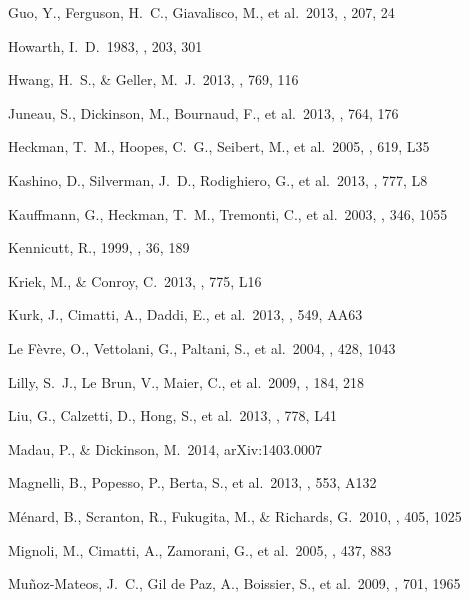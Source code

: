 \documentclass[preprint]{aastex}
\begin{document}
\begin{thebibliography}
 Guo, Y., Ferguson, H.~C., 
Giavalisco, M., et al.\ 2013, \apjs, 207, 24

 Howarth, I.~D.\ 1983, \mnras, 203, 301

 Hwang, H.~S., \& Geller, M.~J.\ 2013,
\apj, 769, 116

 Juneau, S., Dickinson, 
M., Bournaud, F., et al.\ 2013, \apj, 764, 176

 Heckman, T.~M., Hoopes, 
C.~G., Seibert, M., et al.\ 2005, \apjl, 619, L35

 Kashino, D., Silverman, 
J.~D., Rodighiero, G., et al.\ 2013, \apjl, 777, L8

 Kauffmann, G., 
Heckman, T.~M., Tremonti, C., et al.\ 2003, \mnras, 346, 1055

 Kennicutt, R., 1999, \araa, 36, 189

 Kriek, M., \& Conroy, C.\ 2013,
\apjl, 775, L16 

 Kurk, J., Cimatti, A., Daddi, E., et al.\
2013, \aap, 549, AA63

 Le F{\`e}vre, O., Vettolani, G.,
Paltani, S., et al.\ 2004, \aap, 428, 1043

 Lilly, S.~J., Le Brun, V.,
Maier, C., et al.\ 2009, \apjs, 184, 218

 Liu, G., Calzetti, D., 
Hong, S., et al.\ 2013, \apjl, 778, L41

 Madau, P., \& Dickinson, M.\ 2014,
arXiv:1403.0007

 Magnelli, B., Popesso, P.,
Berta, S., et al.\ 2013, \aap, 553, A132

 M{\'e}nard, B., Scranton, R.,
Fukugita, M., \& Richards, G.\ 2010, \mnras, 405, 1025

 Mignoli, M., Cimatti, A., Zamorani,
G., et al.\ 2005, \aap, 437, 883

Mu{\~n}oz-Mateos, J.~C., Gil de Paz, A., Boissier, S., et al.\ 2009, \apj, 
701, 1965


\end{thebibliography}
\end{document}
